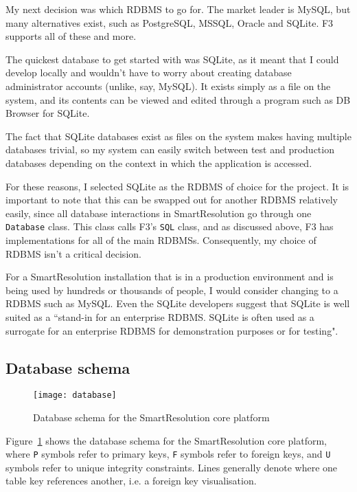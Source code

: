 My next decision was which RDBMS to go for. The market leader is MySQL, but many alternatives exist, such as PostgreSQL, MSSQL, Oracle and SQLite. F3 supports all of these and more.~\cite{f3:sqlConstructor}

The quickest database to get started with was SQLite, as it meant that I could develop locally and wouldn't have to worry about creating database administrator accounts (unlike, say, MySQL). It exists simply as a file on the system, and its contents can be viewed and edited through a program such as DB Browser for SQLite.

The fact that SQLite databases exist as files on the system makes having multiple databases trivial, so my system can easily switch between test and production databases depending on the context in which the application is accessed.

For these reasons, I selected SQLite as the RDBMS of choice for the project. It is important to note that this can be swapped out for another RDBMS relatively easily, since all database interactions in SmartResolution go through one \lstinline{Database} class. This class calls F3's \lstinline{SQL} class, and as discussed above, F3 has implementations for all of the main RDBMSs. Consequently, my choice of RDBMS isn't a critical decision.

For a SmartResolution installation that is in a production environment and is being used by hundreds or thousands of people, I would consider changing to a RDBMS such as MySQL. Even the SQLite developers suggest that SQLite is well suited as a ``stand-in for an enterprise RDBMS. SQLite is often used as a surrogate for an enterprise RDBMS for demonstration purposes or for testing".~\cite{sqliteFeatures}

\subsection{Database schema}

\begin{figure}[h!]
  \centering
    \ifimages
    \texttt{[image: database]}
    \fi
  \caption{Database schema for the SmartResolution core platform}
  \label{uml:databaseSchema}
\end{figure}

Figure~\ref{uml:databaseSchema} shows the database schema for the SmartResolution core platform, where \lstinline{P} symbols refer to primary keys, \lstinline{F} symbols refer to foreign keys, and \lstinline{U} symbols refer to unique integrity constraints. Lines generally denote where one table key references another, i.e. a foreign key visualisation.


